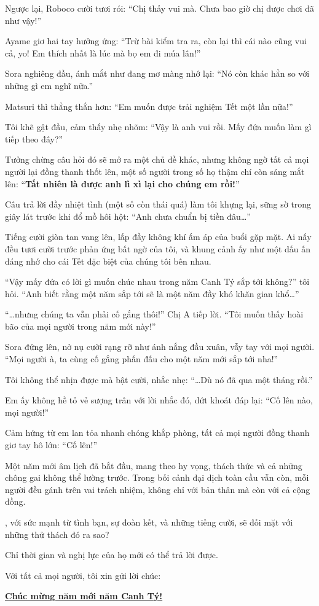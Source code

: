 \documentclass[../main.tex]{subfiles}
\begin{document}
Ngược lại, Roboco cười tươi rói: ``Chị thấy vui mà. Chưa bao giờ chị được chơi đã như vậy!''

Ayame giơ hai tay hưởng ứng: ``Trừ bài kiểm tra ra, còn lại thì cái nào cũng vui cả, yo! Em thích nhất là lúc mà bọ em đi múa lân!''

Sora nghiêng đầu, ánh mắt như đang mơ màng nhớ lại: ``Nó còn khác hẳn so với những gì em nghĩ nữa.''

Matsuri thì thẳng thắn hơn: ``Em muốn được trải nghiệm Tết một lần nữa!''

Tôi khẽ gật đầu, cảm thấy nhẹ nhõm: ``Vậy là anh vui rồi. Mấy đứa muốn làm gì tiếp theo đây?''

Tưởng chừng câu hỏi đó sẽ mở ra một chủ đề khác, nhưng không ngờ tất cả mọi người lại đồng thanh thốt lên, một số người trong số họ thậm chí còn sáng mắt lên: ``\textbf{Tất nhiên là được anh lì xì lại cho chúng em rồi!}''

Câu trả lời đầy nhiệt tình (một số còn thái quá) làm tôi khựng lại, sững sờ trong giây lát trước khi đổ mồ hôi hột: ``Anh chưa chuẩn bị tiền đâu\dots''

Tiếng cười giòn tan vang lên, lấp đầy không khí ấm áp của buổi gặp mặt. Ai nấy đều tươi cười trước phản ứng bất ngờ của tôi, và khung cảnh ấy như một dấu ấn đáng nhớ cho cái Tết đặc biệt của chúng tôi bên nhau.

``Vậy mấy đứa có lời gì muốn chúc nhau trong năm Canh Tý sắp tới không?'' tôi hỏi. ``Anh biết rằng một năm sắp tới sẽ là một năm đầy khó khăn gian khổ\dots''

``\dots nhưng chúng ta vẫn phải cố gắng thôi!'' Chị A tiếp lời. ``Tôi muốn thấy hoài bão của mọi người trong năm mới này!''

Sora đứng lên, nở nụ cười rạng rỡ như ánh nắng đầu xuân, vẫy tay với mọi người. ``Mọi người à, ta cùng cố gắng phấn đấu cho một năm mới sắp tới nha!''

Tôi không thể nhịn được mà bật cười, nhắc nhẹ: ``\dots Dù nó đã qua một tháng rồi.''

Em ấy không hề tỏ vẻ sượng trân với lời nhắc đó, dứt khoát đáp lại: ``Cố lên nào, mọi người!''

Cảm hứng từ em lan tỏa nhanh chóng khắp phòng, tất cả mọi người đồng thanh giơ tay hô lớn: ``Cố lên!''

Một năm mới âm lịch đã bắt đầu, mang theo hy vọng, thách thức và cả những chông gai không thể lường trước. Trong bối cảnh đại dịch toàn cầu vẫn còn, mỗi người đều gánh trên vai trách nhiệm, không chỉ với bản thân mà còn với cả cộng đồng.

\hll, với sức mạnh từ tình bạn, sự đoàn kết, và những tiếng cười, sẽ đối mặt với những thử thách đó ra sao?

Chỉ thời gian và nghị lực của họ mới có thể trả lời được.

Với tất cả mọi người, tôi xin gửi lời chúc:

\begin{center}
    \uline{\textbf{Chúc mừng năm mới năm Canh Tý!}}
\end{center}
\end{document}
